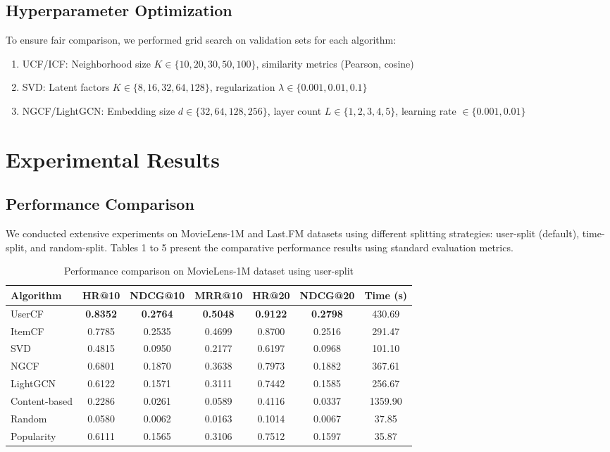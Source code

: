 \documentclass[sigconf,nonacm]{acmart} %
\begin{document}
\subsection{Hyperparameter Optimization}  
To ensure fair comparison, we performed grid search on validation sets for each algorithm:  
\begin{enumerate}  
    \item UCF/ICF: Neighborhood size $K \in \{10, 20, 30, 50, 100\}$, similarity metrics (Pearson, cosine)  
    \item SVD: Latent factors $K \in \{8, 16, 32, 64, 128\}$, regularization $\lambda \in \{0.001, 0.01, 0.1\}$  
    \item NGCF/LightGCN: Embedding size $d \in \{32, 64, 128, 256\}$, layer count $L \in \{1, 2, 3, 4, 5\}$, learning rate $\in \{0.001, 0.01\}$  
\end{enumerate}  

\section{Experimental Results}  
\subsection{Performance Comparison}  

We conducted extensive experiments on MovieLens-1M and Last.FM datasets using different splitting strategies: user-split (default), time-split, and random-split. Tables 1 to 5 present the comparative performance results using standard evaluation metrics.  

\begin{table}[h]  
\caption{Performance comparison on MovieLens-1M dataset using user-split}  
\label{tab:ml1m}  
\centering  
\scriptsize  
\begin{tabular}{lcccccc}  
\hline  
\textbf{Algorithm} & \textbf{HR@10} & \textbf{NDCG@10} & \textbf{MRR@10} & \textbf{HR@20} & \textbf{NDCG@20} & \textbf{Time (s)} \\
\hline  
UserCF & \textbf{0.8352} & \textbf{0.2764} & \textbf{0.5048} & \textbf{0.9122} & \textbf{0.2798} & 430.69 \\
ItemCF & 0.7785 & 0.2535 & 0.4699 & 0.8700 & 0.2516 & 291.47 \\
SVD & 0.4815 & 0.0950 & 0.2177 & 0.6197 & 0.0968 & 101.10 \\
NGCF & 0.6801 & 0.1870 & 0.3638 & 0.7973 & 0.1882 & 367.61 \\
LightGCN & 0.6122 & 0.1571 & 0.3111 & 0.7442 & 0.1585 & 256.67 \\
Content-based & 0.2286 & 0.0261 & 0.0589 & 0.4116 & 0.0337 & 1359.90 \\
Random & 0.0580 & 0.0062 & 0.0163 & 0.1014 & 0.0067 & 37.85 \\
Popularity & 0.6111 & 0.1565 & 0.3106 & 0.7512 & 0.1597 & 35.87 \\
\hline  
\end{tabular}  
\end{table}  
\end{document}
